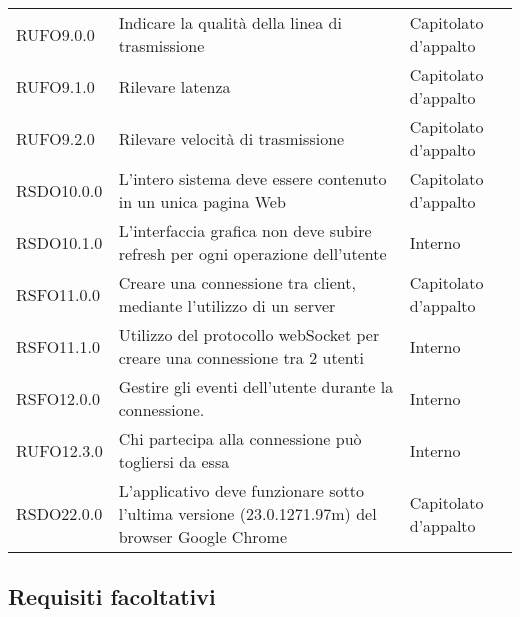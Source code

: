 \begin{longtable}{lp{}l}
RUFO9.0.0 & Indicare la qualità della linea di trasmissione & Capitolato d'appalto \\
RUFO9.1.0 & Rilevare latenza & Capitolato d'appalto \\
RUFO9.2.0 & Rilevare velocità di trasmissione & Capitolato d'appalto \\
RSDO10.0.0 & L'intero sistema deve essere contenuto in un unica pagina Web & Capitolato d'appalto \\
RSDO10.1.0 & L'interfaccia grafica non deve subire refresh per ogni operazione dell'utente & Interno \\
RSFO11.0.0 & Creare una connessione tra client, mediante l'utilizzo di un server & Capitolato d'appalto \\
RSFO11.1.0 & Utilizzo del protocollo webSocket per creare una connessione tra 2 utenti & Interno \\
RSFO12.0.0 & Gestire gli eventi dell'utente durante la connessione. & Interno \\
RUFO12.3.0 & Chi partecipa alla connessione può togliersi da essa & Interno \\
RSDO22.0.0 & L'applicativo deve funzionare sotto l'ultima versione (23.0.1271.97m) del browser Google Chrome & Capitolato d'appalto \\
\bottomrule
\end{longtable}
\subsection{Requisiti facoltativi}

